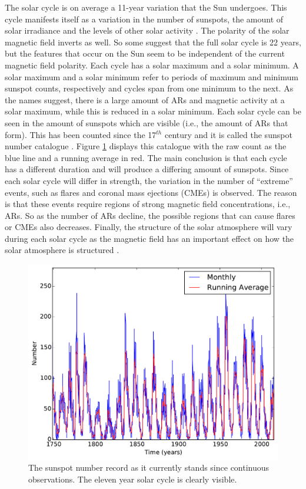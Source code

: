     The solar cycle is on average a 11-year variation that the Sun undergoes.
    This cycle manifests itself as a variation in the number of sunspots, the amount of solar irradiance and the levels of other solar activity \citep{climate}.
    The polarity of the solar magnetic field inverts as well.
    So some suggest that the full solar cycle is 22 years, but the features that occur on the Sun seem to be independent of the current magnetic field polarity. 
    Each cycle has a solar maximum and a solar minimum.
    A solar maximum and a solar minimum refer to periods of maximum and minimum sunspot counts, respectively and cycles span from one minimum to the next.
    As the names suggest, there is a large amount of ARs and magnetic activity at a solar maximum, while this is reduced in a solar minimum.
    Each solar cycle can be seen in the amount of sunspots which are visible (i.e., the amount of ARs that form).
    This has been counted since the 17$^{{th}}$ century and it is called the sunspot number catalogue \citep{Eddy18061976}.
    Figure \ref{fig:AR_Num} displays this catalogue with the raw count as the blue line and a running average in red.
    The main conclusion is that each cycle has a different duration and will produce a differing amount of sunspots.
    Since each solar cycle will differ in strength, the variation in the number of ``extreme'' events, such as flares and coronal mass ejections (CMEs) is observed.
    The reason is that these events require regions of strong magnetic field concentrations, i.e., ARs.
    So as the number of ARs decline, the possible regions that can cause flares or CMEs also decreases.
    Finally, the structure of the solar atmosphere will vary during each solar cycle as the magnetic field has an important effect on how the solar atmosphere is structured \citep{Sven}. 

    \begin{figure}
    	\centering
    	\includegraphics[width=\textwidth]{sunspot_number.pdf}
    	\caption{
	    		 The sunspot number record as it currently stands since continuous observations.  
    		     The eleven year solar cycle is clearly visible.
    	        }
    	\label{fig:AR_Num}
    \end{figure}   
            
